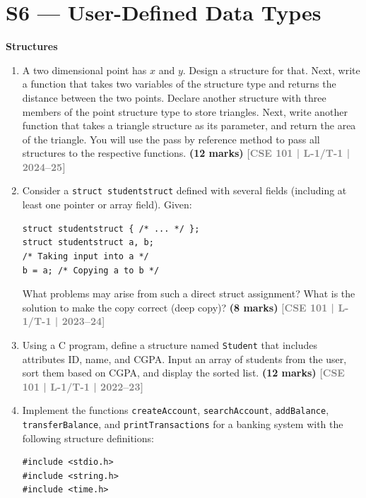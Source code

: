 \documentclass[12pt,a3paper]{article}
\newcommand{\yr}[1]{\hfill\textcolor{gray}{\small\textbf{[#1]}}}
\newcommand{\mk}[1]{\textcolor{orange!70!black}{\small\textbf{(#1 marks)}}}
\newcommand{\subtopic}[2]{%
  \vspace{10pt}
  \noindent\begin{tcolorbox}[colback=#1!8,colframe=#1,boxrule=0.6pt,arc=4pt,
    left=6pt,right=6pt,top=4pt,bottom=4pt]
    \small\bfseries\textcolor{#1}{#2}
  \end{tcolorbox}
  \vspace{2pt}
}
\begin{document}
\section{S6 --- User-Defined Data Types}
\label{sec:S6}

\subtopic{cC}{Structures}
\label{sub:s6-struct}

\begin{enumerate}

\item A two dimensional point has $x$ and $y$. Design a structure for that. Next, write a function that takes two variables of the structure type and returns the distance between the two points. Declare another structure with three members of the point structure type to store triangles. Next, write another function that takes a triangle structure as its parameter, and return the area of the triangle. You will use the pass by reference method to pass all structures to the respective functions.  
\mk{12} \yr{CSE 101 | L-1/T-1 | 2024--25}

\item Consider a \texttt{struct studentstruct} defined with several fields (including at least one pointer or array field). Given:
 
\begin{lstlisting}
struct studentstruct { /* ... */ };
struct studentstruct a, b;
/* Taking input into a */
b = a; /* Copying a to b */
\end{lstlisting}
What problems may arise from such a direct struct assignment? What is the solution to make the copy correct (deep copy)?
\mk{8} \yr{CSE 101 | L-1/T-1 | 2023--24}

\item Using a C program, define a structure named \texttt{Student} that includes attributes ID, name, and CGPA. Input an array of students from the user, sort them based on CGPA, and display the sorted list.
\mk{12} \yr{CSE 101 | L-1/T-1 | 2022--23}

\item Implement the functions \texttt{createAccount}, \texttt{searchAccount}, \texttt{addBalance}, \texttt{transferBalance}, and \texttt{printTransactions} for a banking system with the following structure definitions:
\begin{lstlisting}
#include <stdio.h>
#include <string.h>
#include <time.h>


\end{lstlisting}
\end{enumerate}
\end{document}
